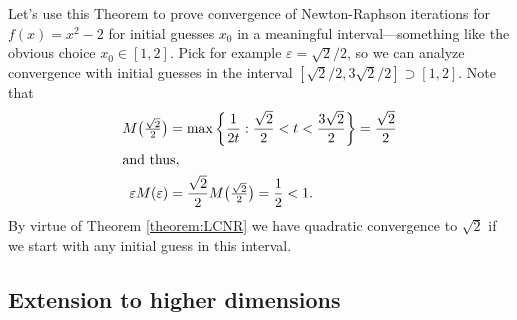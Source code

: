 \begin{example}
Let's use this Theorem to prove convergence of Newton-Raphson iterations for $f(x)= x^2-2$ for initial guesses $x_0$ in a meaningful interval---something like the obvious choice $x_0 \in [1,2]$.  Pick for example $\varepsilon = \sqrt{2}/2$, so we can analyze convergence with initial guesses in the interval $[\sqrt{2}/2, 3\sqrt{2}/2] \supset [1,2]$.  Note that
\begin{align*}
M\big(\tfrac{\sqrt{2}}{2}\big) &= \max \bigg\{ \frac{1}{2t} : \frac{\sqrt{2}}{2} < t < \frac{3\sqrt{2}}{2} \bigg\} = \frac{\sqrt{2}}{2} \\
\intertext{and thus,}
\varepsilon M(\varepsilon) &= \frac{\sqrt{2}}{2} M\big(\tfrac{\sqrt{2}}{2}\big) = \frac{1}{2} < 1.
\end{align*}
By virtue of Theorem \ref{theorem:LCNR} we have quadratic convergence to $\sqrt{2}$ if we start with any initial guess in this interval.
\end{example}

\subsection{Extension to higher dimensions}

